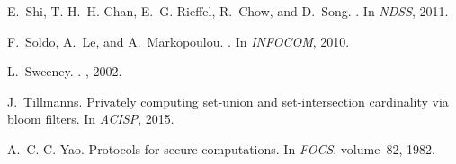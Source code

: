 \documentclass[conference]{IEEEtran}
\begin{document}
\begin{thebibliography}{10}
E.~Shi, T.-H.~H. Chan, E.~G. Rieffel, R.~Chow, and D.~Song.
.
\newblock In {\em NDSS}, 2011.

F.~Soldo, A.~Le, and A.~Markopoulou.
.
\newblock In {\em INFOCOM}, 2010.

L.~Sweeney.
.
, 2002.

J.~Tillmanns.
\newblock Privately computing set-union and set-intersection cardinality via
  bloom filters.
\newblock In {\em ACISP}, 2015.

A.~C.-C. Yao.
\newblock Protocols for secure computations.
\newblock In {\em FOCS}, volume~82, 1982.

\end{thebibliography}
 
\end{document}
